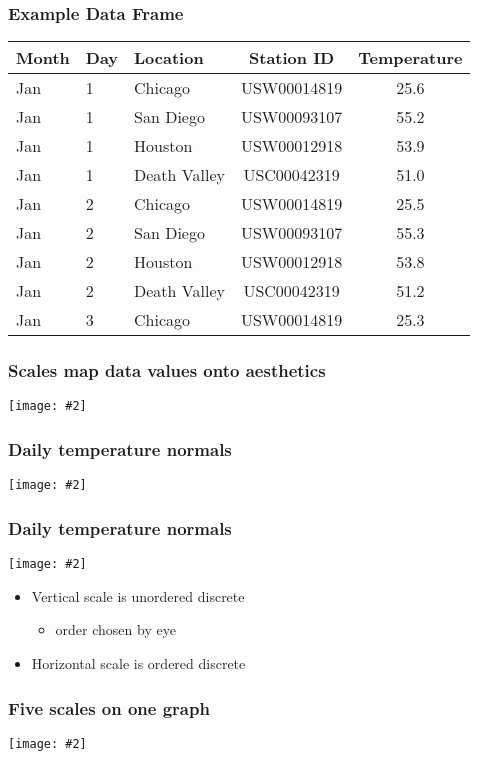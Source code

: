 \documentclass{beamer}
\newcommand{\bi}{\begin{itemize}}
\newcommand{\li}{\item}
\newcommand{\ei}{\end{itemize}}
\newcommand{\fig}[2]{\centerline{\texttt{[image: \#2]}}}
\newcommand{\bfr}[1]{\begin{frame}[fragile]\frametitle{{ #1 }}}
\begin{document}
\bfr{Example Data Frame}
\begin{tabular}{lllcc}
Month	 &Day	 &Location	 &Station ID	 &Temperature\\\hline
Jan	 &1	 &Chicago	 &USW00014819	 &25.6\\
Jan	 &1	 &San Diego	 &USW00093107	 &55.2\\
Jan	 &1	 &Houston	 &USW00012918	 &53.9\\
Jan	 &1	 &Death Valley	 &USC00042319	 &51.0\\
Jan	 &2	 &Chicago	 &USW00014819	 &25.5\\
Jan	 &2	 &San Diego	 &USW00093107	 &55.3\\
Jan	 &2	 &Houston	 &USW00012918	 &53.8\\
Jan	 &2	 &Death Valley	 &USC00042319	 &51.2\\
Jan	 &3	 &Chicago	 &USW00014819	 &25.3
\end{tabular}
\end{frame}

\bfr{Scales map data values onto aesthetics}

\fig{1}{basic-scales-example-1}
\end{frame}

\bfr{Daily temperature normals}
\fig{1}{temp-normals-vs-time-1}
\end{frame}

\bfr{Daily temperature normals}
\fig{1}{four-locations-temps-by-month-1}

\bi
\li Vertical scale is unordered discrete
\bi\li order chosen by eye \ei
\li Horizontal scale is ordered discrete
\ei
\end{frame}

\bfr{Five scales on one graph}
\fig{0.8}{mtcars-five-scale-1}
\end{frame}
\end{document}

